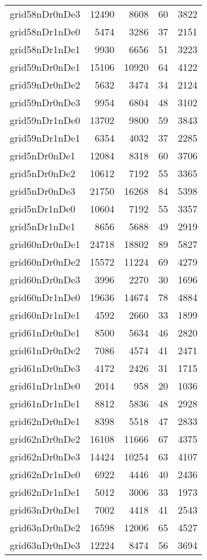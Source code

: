 \begin{tabular}{lrrrr}
grid58nDr0nDe3 & 12490 & 8608 & 60 & 3822 \\
grid58nDr1nDe0 & 5474 & 3286 & 37 & 2151 \\
grid58nDr1nDe1 & 9930 & 6656 & 51 & 3223 \\
grid59nDr0nDe1 & 15106 & 10920 & 64 & 4122 \\
grid59nDr0nDe2 & 5632 & 3474 & 34 & 2124 \\
grid59nDr0nDe3 & 9954 & 6804 & 48 & 3102 \\
grid59nDr1nDe0 & 13702 & 9800 & 59 & 3843 \\
grid59nDr1nDe1 & 6354 & 4032 & 37 & 2285 \\
grid5nDr0nDe1 & 12084 & 8318 & 60 & 3706 \\
grid5nDr0nDe2 & 10612 & 7192 & 55 & 3365 \\
grid5nDr0nDe3 & 21750 & 16268 & 84 & 5398 \\
grid5nDr1nDe0 & 10604 & 7192 & 55 & 3357 \\
grid5nDr1nDe1 & 8656 & 5688 & 49 & 2919 \\
grid60nDr0nDe1 & 24718 & 18802 & 89 & 5827 \\
grid60nDr0nDe2 & 15572 & 11224 & 69 & 4279 \\
grid60nDr0nDe3 & 3996 & 2270 & 30 & 1696 \\
grid60nDr1nDe0 & 19636 & 14674 & 78 & 4884 \\
grid60nDr1nDe1 & 4592 & 2660 & 33 & 1899 \\
grid61nDr0nDe1 & 8500 & 5634 & 46 & 2820 \\
grid61nDr0nDe2 & 7086 & 4574 & 41 & 2471 \\
grid61nDr0nDe3 & 4172 & 2426 & 31 & 1715 \\
grid61nDr1nDe0 & 2014 & 958 & 20 & 1036 \\
grid61nDr1nDe1 & 8812 & 5836 & 48 & 2928 \\
grid62nDr0nDe1 & 8398 & 5518 & 47 & 2833 \\
grid62nDr0nDe2 & 16108 & 11666 & 67 & 4375 \\
grid62nDr0nDe3 & 14424 & 10254 & 63 & 4107 \\
grid62nDr1nDe0 & 6922 & 4446 & 40 & 2436 \\
grid62nDr1nDe1 & 5012 & 3006 & 33 & 1973 \\
grid63nDr0nDe1 & 7002 & 4418 & 41 & 2543 \\
grid63nDr0nDe2 & 16598 & 12006 & 65 & 4527 \\
grid63nDr0nDe3 & 12224 & 8474 & 56 & 3694 \\

\end{tabular}
